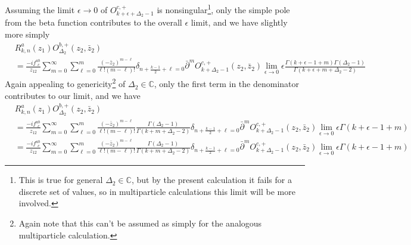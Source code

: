 \documentclass[11pt,letterpaper]{article}
\newcommand{\C}{\mathbb{C}}
\newcommand{\D}{\partial}
\begin{document}
Assuming the limit $\epsilon \to 0$ of $O^{c,+}_{k + \epsilon + \Delta_2 - 1}$ is nonsingular\footnote{This is true for general $\Delta_2 \in \C$, but by the present calculation it fails for a discrete set of values, so in multiparticle calculations this limit will be more involved.}, only the simple pole from the beta function contributes to the overall $\epsilon$ limit, and we have slightly more simply \begin{equation}
\begin{aligned}
& R^a_{k,n} (z_1) O^{b,+}_{\Delta_2} (z_2, \bar{z}_2) \\
& = \frac{- i f^{ab}_{ \ \ c}}{z_{12}} \sum_{m=0}^\infty \sum_{\ell = 0}^m \frac{(- \bar{z}_2)^{m - \ell}}{\ell! (m-\ell)!} \delta_{n + \frac{k- 1}{2} + \ell = 0} \bar{\D}^m O^{c,+}_{k + \Delta_2 - 1}(z_2, \bar{z}_2) \lim_{\epsilon \to 0}  \epsilon \frac{\Gamma(k + \epsilon - 1 + m) \Gamma(\Delta_2 - 1)}{\Gamma( k + \epsilon + m + \Delta_2 - 2)} 
\end{aligned}
\end{equation}
Again appealing to genericity\footnote{Again note that this can't be assumed as simply for the analogous multiparticle calculation.} of $\Delta_2 \in \C$, only the first term in the denominator contributes to our limit, and we have \begin{equation}
\begin{aligned}
& R^a_{k,n} (z_1) O^{b,+}_{\Delta_2} (z_2, \bar{z}_2) \\
& = \frac{- i f^{ab}_{ \ \ c}}{z_{12}} \sum_{m=0}^\infty \sum_{\ell = 0}^m \frac{(- \bar{z}_2)^{m - \ell}}{\ell! (m-\ell)!} \frac{\Gamma(\Delta_2 - 1)}{\Gamma( k + m + \Delta_2 - 2)} \delta_{n + \frac{k- 1}{2} + \ell = 0} \bar{\D}^m O^{c,+}_{k + \Delta_2 - 1}(z_2, \bar{z}_2) \lim_{\epsilon \to 0} \epsilon \Gamma(k + \epsilon - 1 + m) \\
& = \frac{- i f^{ab}_{ \ \ c}}{z_{12}} \sum_{m=0}^\infty \sum_{\ell = 0}^m \frac{(- \bar{z}_2)^{m - \ell}}{\ell! (m-\ell)!} \frac{\Gamma(\Delta_2 - 1)}{\Gamma( k + m + \Delta_2 - 2)} \delta_{n + \frac{k- 1}{2} + \ell = 0} \bar{\D}^m O^{c,+}_{k + \Delta_2 - 1}(z_2, \bar{z}_2) \lim_{\epsilon \to 0} \epsilon \Gamma(k + \epsilon - 1 + m) 
\end{aligned}
\end{equation}
\end{document}
